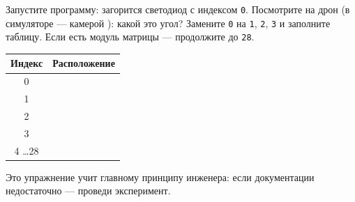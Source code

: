 \begin{taskbox}
Запустите программу: загорится светодиод с индексом \verb|0|. Посмотрите на дрон (в симуляторе --- камерой ): какой это угол? Замените \verb|0| на \verb|1|, \verb|2|, \verb|3| и заполните таблицу. Если есть модуль матрицы --- продолжите до \verb|28|.
\end{taskbox}

\begin{center}
\renewcommand{\arraystretch}{1.4}
\begin{tabular}{|c|p{7cm}|}
\hline
\rowcolor{GeoskanBlue!20} \textbf{Индекс} & \textbf{Расположение} \\
\hline
0 & \dotfill \\ \hline
1 & \dotfill \\ \hline
2 & \dotfill \\ \hline
3 & \dotfill \\ \hline
4 \dots 28 & \dotfill \\ \hline
\end{tabular}
\end{center}

Это упражнение учит главному принципу инженера: если документации недостаточно --- проведи эксперимент.
